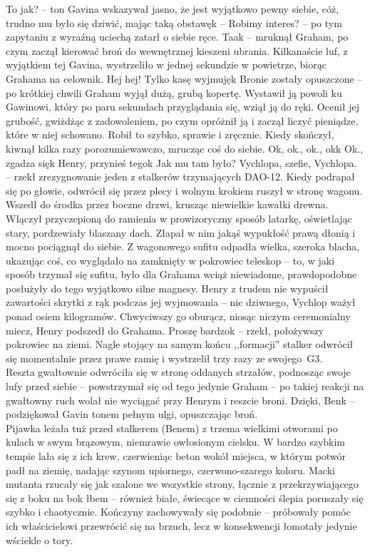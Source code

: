 \documentclass[../MAIN.tex]{subfiles}
\begin{document}
\sx To jak? -- ton Gavina wskazywał jasno, że jest wyjątkowo pewny siebie, cóż, trudno mu było się dziwić, mając taką obstawę\3k -- Robimy interes? -- po tym zapytaniu z wyraźną uciechą zatarł o siebie ręce.
\xx Taa\3k -- mruknął Graham, po czym zaczął kierować broń do wewnętrznej kieszeni ubrania. 
\qd
Kilkanaście luf, z wyjątkiem tej Gavina, wystrzeliło w jednej sekundzie w powietrze, biorąc Grahama na celownik.
\sx Hej hej! Tylko kasę wyjmuję\3k
\qd
Bronie zostały opuszczone -- po krótkiej chwili Graham wyjął dużą, grubą kopertę. Wystawił ją powoli ku Gawinowi, który po paru sekundach przyglądania się, wziął ją do ręki. Ocenił jej grubość, gwiżdżąc z zadowoleniem, po czym opróżnił ją i zaczął liczyć pieniądze, które w niej schowano. Robił to szybko, sprawie i zręcznie. Kiedy skończył, kiwnął kilka razy porozumiewawczo, mrucząc coś do siebie. Ok, ok., ok., ok\3k
\sx Ok., zgadza się\3k Henry, przynieś tego\3k Jak mu tam było?
\xx Vychlopa, szefie, Vychlopa. -- rzekł zrezygnowanie jeden z stalkerów trzymających 
DAO-12. 
\qd
Kiedy podrapał się po głowie, odwrócił się przez plecy i wolnym krokiem ruszył w stronę wagonu. Wszedł do środka przez boczne drzwi, krusząc niewielkie kawałki drewna. Włączył przyczepioną do ramienia w prowizoryczny sposób latarkę, oświetlając stary, pordzewiały blaszany dach. Złapał w nim jakąś wypukłość prawą dłonią i mocno pociągnął do siebie. Z wagonowego sufitu odpadła wielka, szeroka blacha, ukazując coś, co wyglądało na zamknięty w pokrowiec teleskop -- to, w jaki sposób trzymał się sufitu, było dla Grahama wciąż niewiadome, prawdopodobne posłużyły do tego wyjątkowo silne magnesy. Henry z trudem nie wypuścił zawartości skrytki z rąk podczas jej wyjmowania -- nic dziwnego, Vychlop ważył ponad osiem kilogramów. Chwyciwszy go oburącz, niosąc niczym ceremonialny miecz, Henry podszedł do Grahama.
\sx Proszę bardzo\3k -- rzekł, położywszy pokrowiec na ziemi.
\qd
Nagle stojący na samym końcu ,,formacji'' stalker odwrócił się momentalnie przez prawe ramię i wystrzelił trzy razy ze swojego~G3.\\
Reszta gwałtownie odwróciła się w stronę oddanych strzałów, podnosząc swoje lufy przed siebie -- powstrzymał się od tego jedynie Graham -- po takiej reakcji na gwałtowny ruch wolał nie wyciągać przy Henrym i reszcie broni.
\sx Dzięki, Ben\3k -- podziękował Gavin tonem pełnym ulgi, opuszczając broń.\\
\qd
Pijawka leżała tuż przed stalkerem (Benem) z trzema wielkimi otworami po kulach w swym brązowym, niemrawie owłosionym cielsku. W bardzo szybkim tempie lała się z ich krew, czerwieniąc beton wokół miejsca, w którym potwór padł na ziemię, nadając szynom upiornego, czerwono-szarego koloru. Macki mutanta rzucały się jak szalone we wszystkie strony, łącznie z przekrzywiającego się z boku na bok łbem -- również białe, świecące w ciemności ślepia poruszały się szybko i chaotycznie. Kończyny zachowywały się podobnie -- próbowały pomóc ich właścicielowi przewrócić się na brzuch, lecz w konsekwencji łomotały jedynie wściekle o tory.
\end{document}
